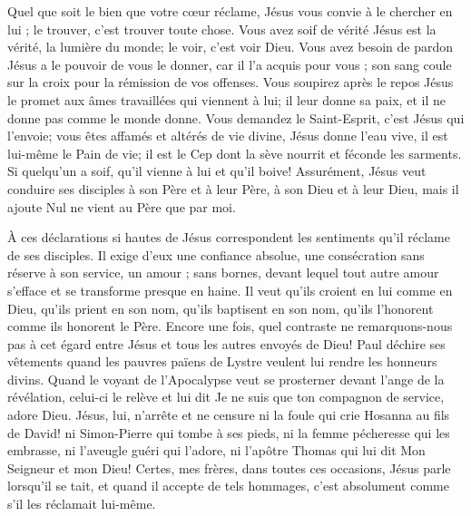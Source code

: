 Quel que soit le bien que votre cœur réclame, Jésus vous convie à le chercher en lui ; \Og{} le trouver, c’est trouver toute chose\Fg{}. Vous avez soif de vérité\frcolon{} Jésus est la vérité, la lumière du monde; le voir, c’est voir Dieu. Vous avez besoin de pardon\frcolon{} Jésus a le pouvoir de vous le donner, car il l’a acquis pour vous ; son sang coule sur la croix pour la rémission de vos offenses. Vous soupirez après le repos\frcolon{} Jésus le promet aux âmes travaillées qui viennent à lui; il leur donne sa paix, et il ne donne pas comme le monde donne. Vous demandez le Saint-Esprit, c’est Jésus qui l’envoie; vous êtes affamés et altérés de vie divine, Jésus donne l’eau vive, il est lui-même le Pain de vie; il est le Cep dont la sève nourrit et féconde les sarments. Si quelqu’un a soif, qu’il vienne à lui et qu’il boive! Assurément, Jésus veut conduire ses disciples à son Père et à leur Père, à son Dieu et à leur Dieu, mais il ajoute\frcolon{} \Og{} Nul ne vient au Père que par moi.\Fg{}

À ces déclarations si hautes de Jésus correspondent les sentiments qu’il réclame de ses disciples. Il exige d’eux une confiance absolue, une consécration sans réserve à son service, un amour ; sans bornes, devant lequel tout autre amour s’efface et se transforme presque en haine.
Il veut qu’ils croient en lui comme en Dieu, qu’ils prient en son nom, qu’ils baptisent en son nom, qu’ils l’honorent comme ils honorent le Père.
Encore une fois, quel contraste ne remarquons-nous pas à cet égard entre Jésus et tous les autres envoyés de Dieu!
Paul déchire ses vêtements quand les pauvres païens de Lystre veulent lui rendre les honneurs divins.
Quand le voyant de l’Apocalypse veut se prosterner devant l’ange de la révélation, celui-ci le relève et lui dit\frcolon{} \Og{} Je ne suis que ton compagnon de service, adore Dieu.\Fg{}
Jésus, lui, n’arrête et ne censure ni la foule qui crie\frcolon{} \Og{} Hosanna au fils de David!\Fg{}
ni Simon-Pierre qui tombe à ses pieds, ni la femme pécheresse qui les embrasse,
ni l’aveugle guéri qui l’adore,
ni l’apôtre Thomas qui lui dit\frcolon{} \Og{} Mon Seigneur et mon Dieu!\Fg{}
Certes, mes frères, dans toutes ces occasions, Jésus parle lorsqu’il se tait, et quand il accepte de tels hommages, c’est absolument comme s’il les réclamait lui-même.

